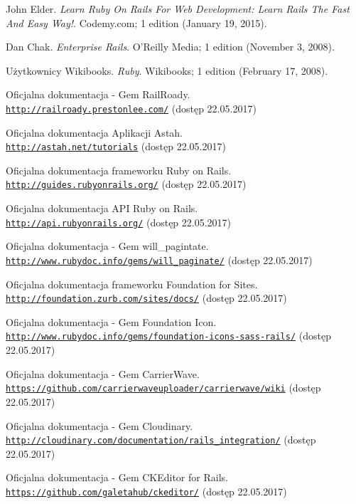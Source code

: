 \documentclass[openright]{xmgr}
\begin{document}
\begin{thebibliography}{9}
John Elder.
\textit{Learn Ruby On Rails For Web Development: Learn Rails The Fast And Easy Way!}.
Codemy.com; 1 edition (January 19, 2015).

Dan Chak.
\textit{Enterprise Rails}.
O'Reilly Media; 1 edition (November 3, 2008).

Użytkownicy Wikibooks.
\textit{Ruby}.
Wikibooks; 1 edition (February 17, 2008).

Oficjalna dokumentacja - Gem RailRoady.
\\\texttt{\url{http://railroady.prestonlee.com/}} (dostęp 22.05.2017)

Oficjalna dokumentacja Aplikacji Astah.
\\\texttt{\url{http://astah.net/tutorials}} (dostęp 22.05.2017)

Oficjalna dokumentacja frameworku Ruby on Rails.
\\\texttt{\url{http://guides.rubyonrails.org/}} (dostęp 22.05.2017)

Oficjalna dokumentacja API Ruby on Rails.
\\\texttt{\url{http://api.rubyonrails.org/}} (dostęp 22.05.2017)

Oficjalna dokumentacja - Gem will\_pagintate.
\\\texttt{\url{http://www.rubydoc.info/gems/will_paginate/}} (dostęp 22.05.2017)

Oficjalna dokumentacja frameworku Foundation for Sites.
\\\texttt{\url{http://foundation.zurb.com/sites/docs/}} (dostęp 22.05.2017)

Oficjalna dokumentacja - Gem Foundation Icon.
\\\texttt{\url{http://www.rubydoc.info/gems/foundation-icons-sass-rails/}} (dostęp 22.05.2017)

Oficjalna dokumentacja - Gem CarrierWave.
\\\texttt{\url{https://github.com/carrierwaveuploader/carrierwave/wiki}} (dostęp 22.05.2017)

Oficjalna dokumentacja - Gem Cloudinary.
\\\texttt{\url{http://cloudinary.com/documentation/rails_integration/}} (dostęp 22.05.2017)

Oficjalna dokumentacja - Gem CKEditor for Rails.
\\\texttt{\url{https://github.com/galetahub/ckeditor/}} (dostęp 22.05.2017)


\end{thebibliography}
\end{document}
